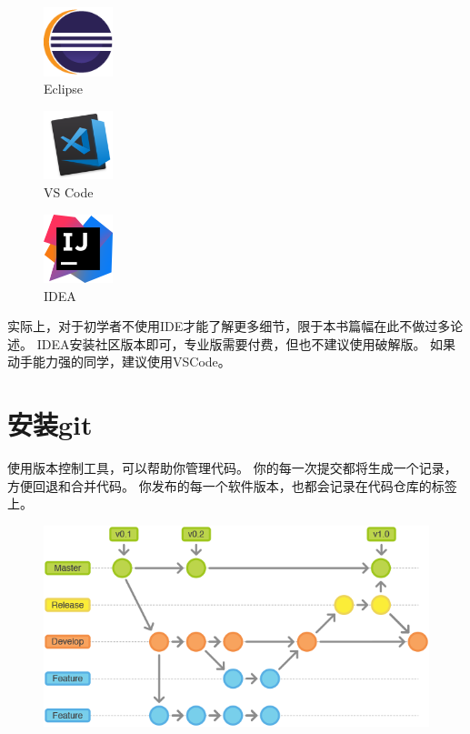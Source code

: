 \begin{figure}[!htb]
	\centering
	\begin{minipage}{0.2\textwidth}
		\includegraphics[width=2cm]{images/logo_eclipse.png} \\
		\centering Eclipse
	\end{minipage}
	\begin{minipage}{0.2\textwidth}
		\includegraphics[width=2cm]{images/logo_vscode.png} \\
		\centering VS Code
	\end{minipage}
	\begin{minipage}{0.2\textwidth}
		\includegraphics[width=2cm]{images/logo_idea.png} \\
		\centering IDEA
	\end{minipage}
\end{figure}

实际上，对于初学者不使用IDE才能了解更多细节，限于本书篇幅在此不做过多论述。
IDEA安装社区版本即可，专业版需要付费，但也不建议使用破解版。
如果动手能力强的同学，建议使用VSCode。

\section{安装git}
使用版本控制工具，可以帮助你管理代码。
你的每一次提交都将生成一个记录，方便回退和合并代码。
你发布的每一个软件版本，也都会记录在代码仓库的标签上。

\begin{figure}[!htb]
	\centerline{\includegraphics[scale=.8]{images/git-workflow.png}}
\end{figure}

